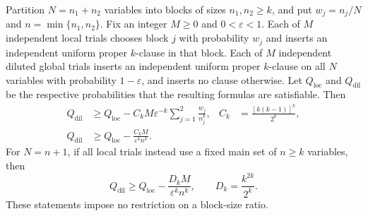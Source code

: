 \begin{lemma}\label{cmp:trial-comparison}
Partition $N=n_1+n_2$ variables into blocks of sizes $n_1,n_2\ge k$,
and put $w_j=n_j/N$ and $n=\min\{n_1,n_2\}$.  Fix an integer $M\ge0$
and $0<\varepsilon<1$.  Each of $M$ independent local trials chooses
block $j$ with probability $w_j$ and inserts an independent uniform
proper $k$-clause in that block.  Each of $M$ independent diluted global
trials inserts an independent uniform proper $k$-clause on all $N$
variables with probability $1-\varepsilon$, and inserts no clause
otherwise.  Let $Q_{\mathrm{loc}}$ and $Q_{\mathrm{dil}}$ be the
respective probabilities that the resulting formulas are satisfiable.
Then
\begin{align}
 Q_{\mathrm{dil}}
 &\ge Q_{\mathrm{loc}}-
 C_k M\varepsilon^{-k}\sum_{j=1}^{2}\frac{w_j}{n_j^k},
 & C_k&=\frac{[k(k-1)]^k}{2^k},\label{cmp:weighted-replacement}\\
 Q_{\mathrm{dil}}
 &\ge Q_{\mathrm{loc}}-\frac{C_kM}{\varepsilon^k n^k}.
 \label{cmp:coarse-replacement}
\end{align}
For $N=n+1$, if all local trials instead use a fixed main set of
$n\ge k$ variables, then
\begin{equation}\label{cmp:neighbor-replacement}
 Q_{\mathrm{dil}}\ge Q_{\mathrm{loc}}
       -\frac{D_kM}{\varepsilon^k n^k},\qquad
 D_k=\frac{k^{2k}}{2^k}.
\end{equation}
These statements impose no restriction on a block-size ratio.
\end{lemma}

